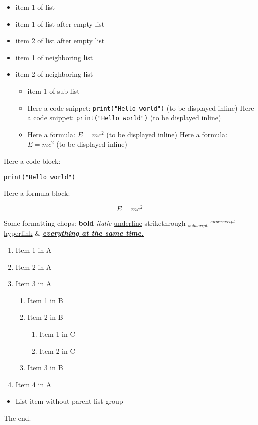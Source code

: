 \documentclass[11pt,a4paper]{article}
\begin{document}
\begin{itemize}
\item item 1 of list
\end{itemize}

\begin{itemize}
\item item 1 of list after empty list
\item item 2 of list after empty list
\end{itemize}

\begin{itemize}
\item item 1 of neighboring list
\item item 2 of neighboring list
  \begin{itemize}
\item item 1 of sub list
\item Here a code snippet: \texttt{print("Hello world")} (to be displayed inline)
Here a code snippet: \texttt{print("Hello world")} (to be displayed inline)
\item Here a formula: $E=mc^2$ (to be displayed inline)
Here a formula: $E=mc^2$ (to be displayed inline)
  \end{itemize}
\end{itemize}

Here a code block:

\begin{verbatim}
print("Hello world")
\end{verbatim}

Here a formula block:

$$E=mc^2$$



Some formatting chops: \textbf{bold} \textit{italic} \underline{underline} \sout{strikethrough} $_{subscript}$ $^{superscript}$ \href{.}{hyperlink} \& \href{https://github.com/DS4SD/docling}{\sout{\underline{\textit{\textbf{everything at the same time.}}}}}

\begin{enumerate}
\item Item 1 in A
\item Item 2 in A
\item Item 3 in A
  \begin{enumerate}
\item Item 1 in B
\item Item 2 in B
    \begin{enumerate}
\item Item 1 in C
\item Item 2 in C
    \end{enumerate}
\item Item 3 in B
  \end{enumerate}
\item Item 4 in A
\end{enumerate}

\begin{itemize}
\item List item without parent list group
\end{itemize}

The end.
\end{document}
